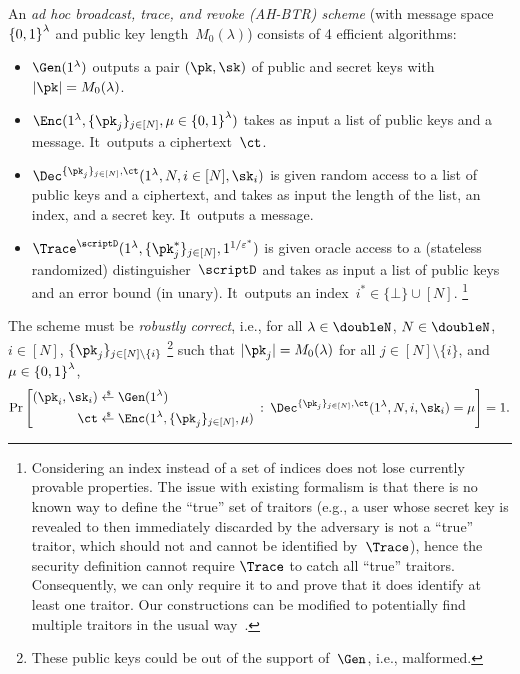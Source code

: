 \begin{definition}[AH-BTR]\label{def:ahbtr}
An \emph{ad hoc broadcast, trace, and revoke (AH-BTR) scheme}
(with message space~${\{0,1\}}^\lambda$ and public key length~$M_0(\lambda)$)
consists of 4 efficient algorithms:
\begin{itemize}
\item $\Gen(1^\lambda)$ outputs a pair $(\pk,\sk)$ of public and secret keys
with ${|\pk|=M_0(\lambda)}$.
\item $\Enc(1^\lambda,\{\pk_j\}_{j\in[N]},{\mu\in\bit^\lambda})$
takes as input
a list of public keys and a message.
It~outputs a ciphertext~$\ct$.
\item $\Dec^{\{\pk_j\}_{j\in[N]},\ct}(1^\lambda,N,i\in[N],\sk_i)$
is given random access to a list of public keys and a ciphertext, and
takes as input
the length of the list,
an index, and
a secret key.
It~outputs a message.
\item $\Trace^\scriptD(1^\lambda,\{\pk^\ast_j\}_{j\in[N]},1^{1/\epsilon^\ast})$
is given oracle access to a (stateless randomized) distinguisher~$\scriptD$ and takes as input
a list of public keys and an error bound (in unary).
It~outputs an index~${i^\ast\in\{\bot\}\cup[N]}$.%
\footnote{Considering an index instead of a set of indices
does not lose currently provable properties.
The issue with existing formalism is that
there is no known way to define the ``true'' set of traitors
(e.g., a user whose secret key is
revealed to then immediately discarded by the adversary
is not a ``true'' traitor,
which should not and cannot be identified by~$\Trace$),
hence the security definition cannot require $\Trace$
to catch all ``true'' traitors.
Consequently, we can only require it to and prove that it does
identify at least one traitor.
Our constructions can be modified to potentially find multiple traitors
in the usual way~\cite{EC:BonSahWat06}.
}
\end{itemize}
The scheme must be \emph{robustly correct}, i.e., for all
${\lambda\in\doubleN}$,
${N\in\doubleN}$,
${i\in[N]}$,\WideNarrow{}{\linebreak[4]}
$\{\pk_j\}_{j\in[N]\setminus\{i\}}$%
\footnote{These public keys could be out of the support of~$\Gen$,
i.e., malformed.}
such that ${|\pk_j|=M_0(\lambda)}$ for all ${j\in[N]\setminus\{i\}}$, and
${\mu\in{\{0,1\}}^\lambda}$,
\begin{align*}
\Pr\left[
\begin{aligned}
(\pk_i,\sk_i)&{}\draws\Gen(1^\lambda)\\
\ct&{}\draws\Enc(1^\lambda,\{\pk_j\}_{j\in[N]},\mu)
\end{aligned}
\::\:
\Dec^{\{\pk_j\}_{j\in[N]},\ct}(1^\lambda,N,i,\sk_i)=\mu
\right]=1.
\end{align*}
\end{definition}
